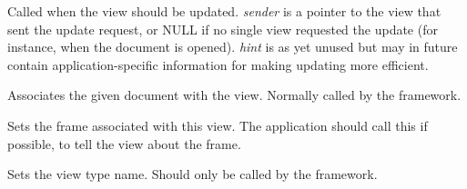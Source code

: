 Called when the view should be updated. {\it sender} is a pointer to the view
that sent the update request, or NULL if no single view requested the update (for instance,
when the document is opened). {\it hint} is as yet unused but may in future contain
application-specific information for making updating more efficient.



Associates the given document with the view. Normally called by the
framework.



Sets the frame associated with this view. The application should call this
if possible, to tell the view about the frame.



Sets the view type name. Should only be called by the framework.


